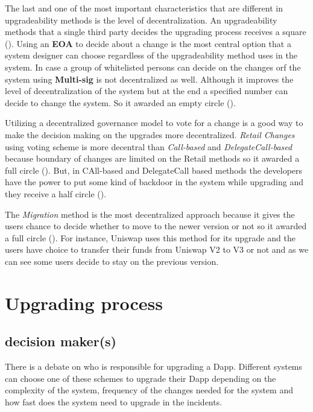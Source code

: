 The last and one of the most important characteristics that are different in upgradeability methods is the level of decentralization. An upgradeability methods that a single third party decides the upgrading process receives a square (\XBox). 
Using an \textbf{EOA} to decide about a change is the most central option that a system designer can choose regardless of the upgradeability method uses in the system. 
In case a group of whitelisted persons can decide on the changes orf the system using \textbf{Multi-sig} is not decentralized as well. Although it improves the level of decentralization of the system but at the end a specified number can decide to change the system. So it awarded an empty circle (\Circle).

Utilizing a decentralized governance model to vote for a change is a good way to make the decision making on the upgrades more decentralized. \textit{Retail Changes} using voting scheme is more decentral than \textit{Call-based} and \textit{DelegateCall-based} because boundary of changes are limited on the Retail methods so it awarded a full circle (\CIRCLE). But, in CAll-based and DelegateCall based methods the developers have the power to put some kind of backdoor in the system while upgrading and they receive a half circle (\LEFTcircle). 

The \textit{Migration} method is the most decentralized approach because it gives the users chance to decide whether to move to the newer version or not so it awarded a full circle (\CIRCLE). For instance, Uniswap uses this method for its upgrade and the users have choice to transfer their funds from Uniswap V2 to V3 or not and as we can see some users decide to stay on the previous version.



 \section{Upgrading process}
  

 \subsection{decision maker(s)} \label{decisionMakers}
 There is a debate on who is responsible for upgrading a Dapp. Different systems can choose one of these schemes to upgrade their Dapp depending on the complexity of the system, frequency of the changes needed for the system and how fast does the system need to upgrade in the incidents.

